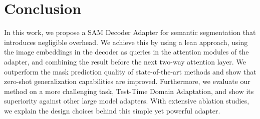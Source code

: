 \section{Conclusion}
\label{sec:conclusion}
In this work, we propose a SAM Decoder Adapter for semantic segmentation that introduces negligible overhead. We achieve this by using a lean approach, using the image embeddings in the decoder as queries in the attention modules of the adapter, and combining the result before the next two-way attention layer. We outperform the mask prediction quality of state-of-the-art methods and show that zero-shot generalization capabilities are improved. Furthermore, we evaluate our method on a more challenging task, Test-Time Domain Adaptation, and show its superiority against other large model adapters. With extensive ablation studies, we explain the design choices behind this simple yet powerful adapter.

